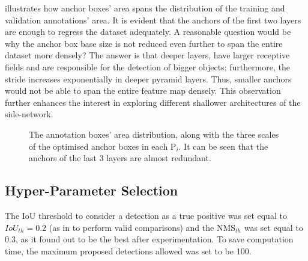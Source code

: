   illustrates how anchor boxes' area spans the distribution of the training and validation annotations' area. It is evident that the anchors of the first two layers are enough to regress the dataset adequately. A reasonable question would be why the anchor box base size is not reduced even further to span the entire dataset more densely? The answer is that deeper layers, have larger receptive fields and are responsible for the detection of bigger objects; furthermore, the stride increases exponentially in deeper pyramid layers. Thus, smaller anchors would not be able to span the entire feature map densely. This observation further enhances the interest in exploring different shallower architectures of the side-network.
 
\begin{figure}[!htb]
  \centering
  \caption{The annotation boxes' area distribution, along with the three scales of the optimised anchor boxes in each P$_i$. It can be seen that the anchors of the last 3 layers are almost redundant.}
  \label{ch4:fig2}
\end{figure}

\subsection{Hyper-Parameter Selection}
The IoU threshold to consider a detection as a true positive was set equal to $IoU_{th} = 0.2$ (as in \cite{bargoti2017deep} to perform valid comparisons) and the $\text{NMS}_{th}$ was set equal to 0.3, as it found out to be the best after experimentation. To save computation time, the maximum proposed detections allowed was set to be 100. 

